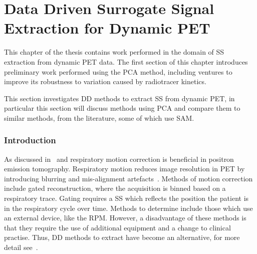 \chapter{Data Driven Surrogate Signal Extraction for Dynamic PET} \label{sec:data_driven_surrogate_signal_extraction_results}
    \newpage
    
        This chapter of the thesis contains work performed in the domain of \gls{SS} extraction from dynamic \gls{PET} data. The first section of this chapter introduces preliminary work performed using the \gls{PCA} method, including ventures to improve its robustness to variation caused by radiotracer kinetics.
    
        This section investigates \gls{DD} methods to extract \gls{SS} from dynamic \gls{PET}, in particular this section will discuss methods using \gls{PCA} and compare them to similar methods, from the literature, some of which use \gls{SAM}.
        
        \subsection{Introduction} \label{sec:pca_data_driven_surrogate_signal_extraction_methods_for_dynamic_pet_introduction}
            As discussed in~ and  respiratory motion correction is beneficial in positron emission tomography. Respiratory motion reduces image resolution in \gls{PET} by introducing blurring and mis-alignment artefacts~. Methods of motion correction include gated reconstruction, where the acquisition is binned based on a respiratory trace. Gating requires a \gls{SS} which reflects the position the patient is in the respiratory cycle over time. Methods to determine  include those which use an external device, like the \gls{RPM}. However, a disadvantage of these methods is that they require the use of additional equipment and a change to clinical practise. Thus, \gls{DD} methods to extract  have become an alternative, for more detail see~. 
            
